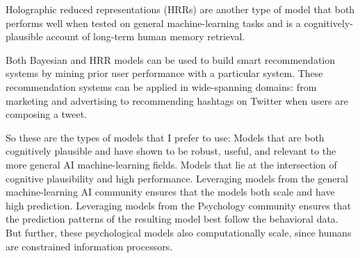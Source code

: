 Holographic reduced representations (HRRs) are another type of model that both performs well when tested on general machine-learning tasks
and is a cognitively-plausible account of long-term human memory retrieval.

Both Bayesian and HRR models can be used to build smart recommendation systems by mining prior user performance with a particular system.
These recommendation systems can be applied in wide-spanning domains: from marketing and advertising to recommending hashtags on Twitter when users are composing a tweet.

So these are the types of models that I prefer to use:
Models that are both cognitively plausible and have shown to be robust, useful, and relevant to the more general AI machine-learning fields.
Models that lie at the intersection of cognitive plausibility and high performance.
Leveraging models from the general machine-learning AI community ensures that the models both scale and have high prediction.
Leveraging models from the Psychology community ensures that the prediction patterns of the resulting model best follow the behavioral data.
But further, these psychological models also computationally scale, since humans are constrained information processors.
